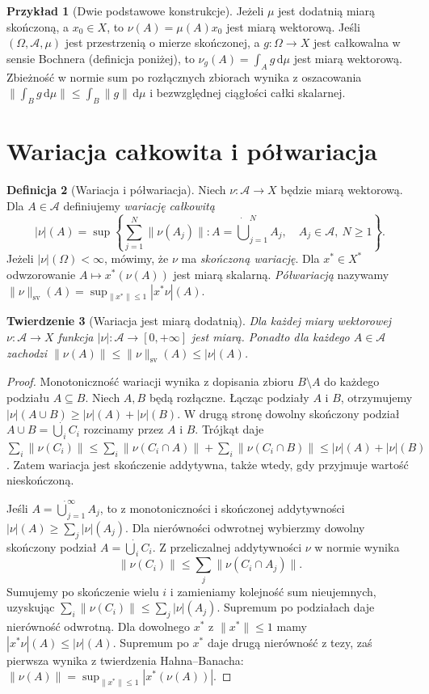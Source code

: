 \documentclass[11pt,a4paper,oneside]{book}
\numberwithin{equation}{chapter}
\theoremstyle{plain}
\newtheorem{twierdzenie}{Twierdzenie}[chapter]
\theoremstyle{definition}
\newtheorem{definicja}[twierdzenie]{Definicja}
\newtheorem{przyklad}[twierdzenie]{Przykład}
\theoremstyle{remark}
\begin{document}
\begin{przyklad}[Dwie podstawowe konstrukcje]
\label{ex:basic-vector-measures-30}
Jeżeli $\mu$ jest dodatnią miarą skończoną, a $x_0\in X$,
to $\nu(A)=\mu(A)x_0$ jest miarą wektorową.
Jeśli $(\Omega,\mathcal A,\mu)$ jest przestrzenią o mierze
skończonej, a $g:\Omega\to X$ jest całkowalna w sensie
Bochnera (definicja poniżej), to
$\nu_g(A)=\int_Ag\,\mathrm d\mu$ jest miarą wektorową.
Zbieżność w normie sum po rozłącznych zbiorach
wynika z oszacowania
$\|\int_Bg\,\mathrm d\mu\|\le\int_B\|g\|\,\mathrm d\mu$
i bezwzględnej ciągłości całki skalarnej.
\end{przyklad}

\section{Wariacja całkowita i półwariacja}
\label{sec:vector-variation-30}
\begin{definicja}[Wariacja i półwariacja]
\label{def:vector-variation-30}
Niech $\nu:\mathcal A\to X$ będzie miarą wektorową.
Dla $A\in\mathcal A$ definiujemy \emph{wariację całkowitą}
\[
 |\nu|(A)=\sup\left\{\sum_{j=1}^{N}\|\nu(A_j)\|:
 A=\dot\bigcup_{j=1}^{N}A_j,\quad A_j\in\mathcal A,\ N\ge1\right\}.
\]
Jeżeli $|\nu|(\Omega)<\infty$, mówimy, że $\nu$ ma
\emph{skończoną wariację}. Dla $x^*\in X^*$ odwzorowanie
$A\mapsto x^*(\nu(A))$ jest miarą skalarną.
\emph{Półwariacją} nazywamy
$\|\nu\|_{\mathrm{sv}}(A)
=\sup_{\|x^*\|\le1}|x^*\nu|(A)$.
\end{definicja}

\begin{twierdzenie}[Wariacja jest miarą dodatnią]
\label{thm:vector-variation-measure-30}
Dla każdej miary wektorowej $\nu:\mathcal A\to X$
funkcja $|\nu|:\mathcal A\to[0,+\infty]$ jest miarą.
Ponadto dla każdego $A\in\mathcal A$ zachodzi
$\|\nu(A)\|\le\|\nu\|_{\mathrm{sv}}(A)\le|\nu|(A)$.
\end{twierdzenie}
\begin{proof}
Monotoniczność wariacji wynika z dopisania zbioru
$B\setminus A$ do każdego podziału $A\subseteq B$.
Niech $A,B$ będą rozłączne. Łącząc podziały $A$ i $B$,
otrzymujemy $|\nu|(A\cup B)\ge|\nu|(A)+|\nu|(B)$.
W drugą stronę dowolny skończony podział
$A\cup B=\dot\bigcup_i C_i$ rozcinamy przez $A$ i $B$.
Trójkąt daje
$\sum_i\|\nu(C_i)\|
\le\sum_i\|\nu(C_i\cap A)\|+\sum_i\|\nu(C_i\cap B)\|
\le|\nu|(A)+|\nu|(B)$.
Zatem wariacja jest skończenie addytywna, także wtedy,
gdy przyjmuje wartość nieskończoną.

Jeśli $A=\dot\bigcup_{j=1}^{\infty}A_j$,
to z monotoniczności i skończonej addytywności
$|\nu|(A)\ge\sum_j|\nu|(A_j)$.
Dla nierówności odwrotnej wybierzmy dowolny
skończony podział $A=\dot\bigcup_i C_i$.
Z przeliczalnej addytywności $\nu$ w normie wynika
\[
 \|\nu(C_i)\|\le\sum_j\|\nu(C_i\cap A_j)\|.
\]
Sumujemy po skończenie wielu $i$ i zamieniamy kolejność
sum nieujemnych, uzyskując
$\sum_i\|\nu(C_i)\|\le\sum_j|\nu|(A_j)$.
Supremum po podziałach daje nierówność odwrotną.
Dla dowolnego $x^*$ z $\|x^*\|\le1$ mamy
$|x^*\nu|(A)\le|\nu|(A)$. Supremum po $x^*$
daje drugą nierówność z tezy, zaś pierwsza wynika
z twierdzenia Hahna--Banacha:
$\|\nu(A)\|=\sup_{\|x^*\|\le1}|x^*(\nu(A))|$.
\end{proof}
\end{document}
